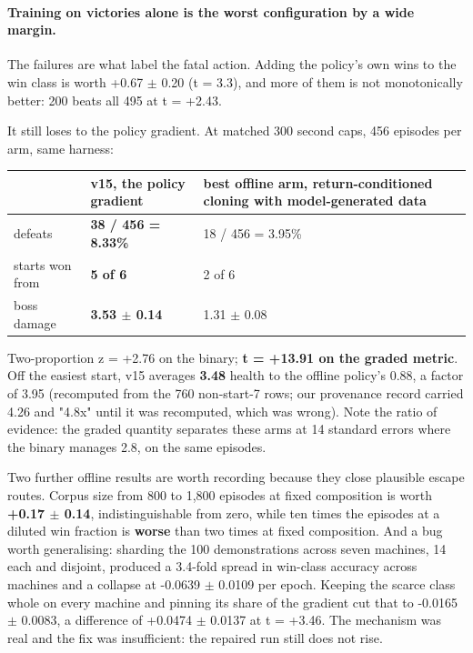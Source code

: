 \documentclass[11pt]{article}
\begin{document}
\paragraph{Training on victories alone is the worst configuration by a wide margin.} The failures are what label the fatal action. Adding the policy's own wins to the win class is worth +0.67 $\pm$ 0.20 (t = 3.3), and more of them is not monotonically better: 200 beats all 495 at t = +2.43.

It still loses to the policy gradient. At matched 300 second caps, 456 episodes per arm, same harness:

\begin{table}[!htbp]
  \centering
  \label{tab:thebestofflinearmagainstthep}
\begin{center}\small
\begin{tabularx}{\linewidth}{@{}XXX@{}}
\toprule
\textbf{} & \textbf{v15, the policy gradient} & \textbf{best offline arm, return-conditioned cloning with model-generated data} \\
\midrule
defeats & \textbf{38 / 456 = 8.33\%} & 18 / 456 = 3.95\% \\
starts won from & \textbf{5 of 6} & 2 of 6 \\
boss damage & \textbf{3.53 $\pm$ 0.14} & 1.31 $\pm$ 0.08 \\
\bottomrule
\end{tabularx}
\end{center}
\end{table}

Two-proportion z = +2.76 on the binary; \textbf{t = +13.91 on the graded metric}. Off the easiest start, v15 averages \textbf{3.48} health to the offline policy's 0.88, a factor of 3.95 (recomputed from the 760 non-start-7 rows; our provenance record carried 4.26 and "4.8x" until it was recomputed, which was wrong). Note the ratio of evidence: the graded quantity separates these arms at 14 standard errors where the binary manages 2.8, on the same episodes.

Two further offline results are worth recording because they close plausible escape routes. Corpus size from 800 to 1,800 episodes at fixed composition is worth \textbf{+0.17 $\pm$ 0.14}, indistinguishable from zero, while ten times the episodes at a diluted win fraction is \textbf{worse} than two times at fixed composition. And a bug worth generalising: sharding the 100 demonstrations across seven machines, 14 each and disjoint, produced a 3.4-fold spread in win-class accuracy across machines and a collapse at -0.0639 $\pm$ 0.0109 per epoch. Keeping the scarce class whole on every machine and pinning its share of the gradient cut that to -0.0165 $\pm$ 0.0083, a difference of +0.0474 $\pm$ 0.0137 at t = +3.46. The mechanism was real and the fix was insufficient: the repaired run still does not rise.
\end{document}
